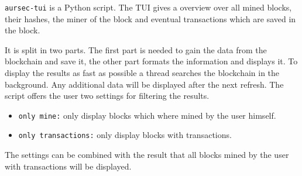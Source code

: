 \label{sec:tui} %
\texttt{aursec-tui} is a Python script. The TUI gives a overview over all mined blocks, their hashes, the miner of the block and eventual transactions which are saved in the block.

It is split in two parts. The first part is needed to gain the data from the blockchain and save it, the other part formats the information and displays it. To display the results as fast as possible a thread searches the blockchain in the background. Any additional data will be displayed after the next refresh. The script offers the user two settings for filtering the results.
\begin{itemize}
	\item \texttt{only mine:} only display blocks which where mined by the user himself.
	\item \texttt{only transactions:} only display blocks with transactions.
\end{itemize}
The settings can be combined with the result that all blocks mined by the user with transactions will be displayed.
